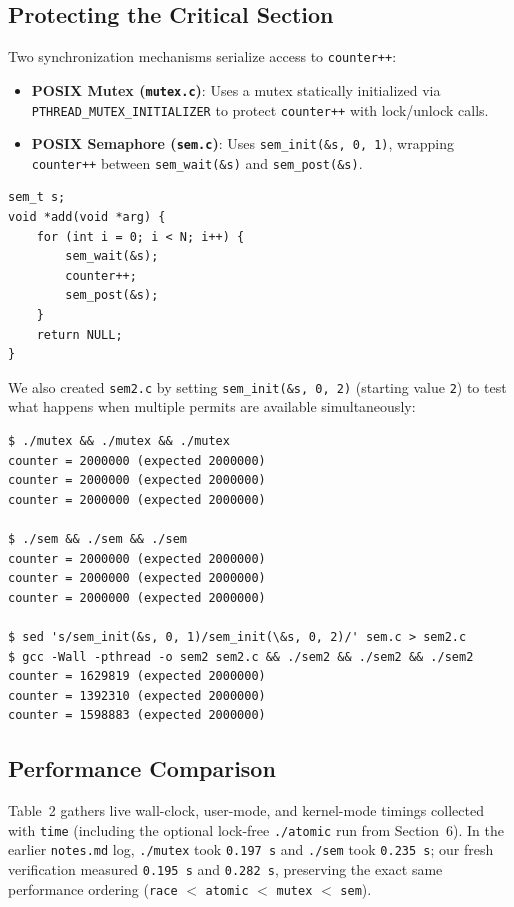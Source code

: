 \documentclass[12pt,a4paper]{article}
\begin{document}
\subsection{Protecting the Critical Section}
Two synchronization mechanisms serialize access to \texttt{counter++}:
\begin{itemize}
    \item \textbf{POSIX Mutex (\texttt{mutex.c})}: Uses a mutex statically initialized via \texttt{PTHREAD\_MUTEX\_\allowbreak INITIALIZER} to protect \texttt{counter++} with lock/unlock calls.
    \item \textbf{POSIX Semaphore (\texttt{sem.c})}: Uses \texttt{sem\_init(\&s, 0, 1)}, wrapping \texttt{counter++} between \texttt{sem\_wait(\&s)} and \texttt{sem\_post(\&s)}.
\end{itemize}

\begin{lstlisting}[style=cstyle,caption={Semaphore lock worker in \texttt{sem.c} (\texttt{sem\_init(\&s, 0, 1)})}]
sem_t s;
void *add(void *arg) {
    for (int i = 0; i < N; i++) {
        sem_wait(&s);
        counter++;
        sem_post(&s);
    }
    return NULL;
}
\end{lstlisting}

We also created \texttt{sem2.c} by setting \texttt{sem\_init(\&s, 0, 2)} (starting value \texttt{2}) to test what happens when multiple permits are available simultaneously:

\begin{lstlisting}[style=consolestyle]
$ ./mutex && ./mutex && ./mutex
counter = 2000000 (expected 2000000)
counter = 2000000 (expected 2000000)
counter = 2000000 (expected 2000000)

$ ./sem && ./sem && ./sem
counter = 2000000 (expected 2000000)
counter = 2000000 (expected 2000000)
counter = 2000000 (expected 2000000)

$ sed 's/sem_init(&s, 0, 1)/sem_init(\&s, 0, 2)/' sem.c > sem2.c
$ gcc -Wall -pthread -o sem2 sem2.c && ./sem2 && ./sem2 && ./sem2
counter = 1629819 (expected 2000000)
counter = 1392310 (expected 2000000)
counter = 1598883 (expected 2000000)
\end{lstlisting}

\subsection{Performance Comparison}
Table~2 gathers live wall-clock, user-mode, and kernel-mode timings collected with \texttt{time} (including the optional lock-free \texttt{./atomic} run from Section~6). In the earlier \texttt{notes.md} log, \texttt{./mutex} took \texttt{0.197\,s} and \texttt{./sem} took \texttt{0.235\,s}; our fresh verification measured \texttt{0.195\,s} and \texttt{0.282\,s}, preserving the exact same performance ordering (\texttt{race} $<$ \texttt{atomic} $<$ \texttt{mutex} $<$ \texttt{sem}).
\end{document}
